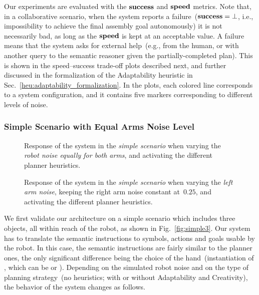 Our experiments are evaluated with the $\textbf{\ensuremath{\text{success}}}$ and $\textbf{\ensuremath{\text{speed}}}$ metrics.
Note that, in a collaborative scenario, when the system reports a failure~($\textbf{\ensuremath{\text{success}}} = \bot$, i.e., impossibility to achieve the final assembly goal autonomously) it is not necessarily bad, as long as the $\textbf{\ensuremath{\text{speed}}}$ is kept at an acceptable value.
A failure means that the system asks for external help~(e.g., from the human, or with another query to the semantic reasoner given the partially-completed plan).
This is shown in the speed--success trade-off plots described next, and further discussed in the formalization of the Adaptability heuristic in Sec.~\ref{heu:adaptability_formalization}.
In the plots, each colored line corresponds to a system configuration, and it contains five markers corresponding to different levels of noise.

\subsubsection{Simple Scenario with Equal Arms Noise Level}
\label{sec:poeticon++:results:quantitative:simple}

\begin{figure*}
 \quad
%
 \quad
%
\caption{Response of the system in the \emph{simple scenario} when varying the \emph{robot noise equally for both arms}, and activating the different planner heuristics.}
\label{fig:simple3:plots}
%
 \quad
%
 \quad
%
\caption{Response of the system in the \emph{simple scenario} when varying the \emph{left arm noise}, keeping the right arm noise constant at~$0.25$, and activating the different planner heuristics.}
\label{fig:simple3_onearm:plots}
\end{figure*}

We first validate our architecture on a simple scenario which includes three objects, all within reach of the robot, as shown in Fig.~\ref{fig:simple3}.
Our system has to translate the semantic instructions to symbols, actions and goals usable by the robot.
In this case, the semantic instructions are fairly similar to the planner ones, the only significant difference being the choice of the hand~(instantiation of , which can be  or ). Depending on the simulated robot noise and on the type of planning strategy~(no heuristics; with or without Adaptability and Creativity), the behavior of the system changes as follows.

